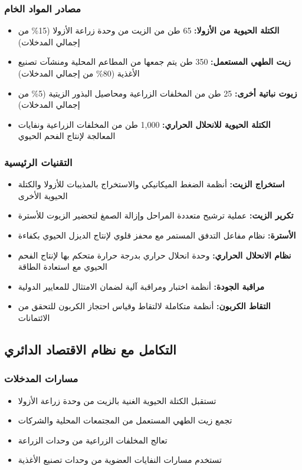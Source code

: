\subsubsection{مصادر المواد الخام}
\begin{itemize}
    \item \textbf{الكتلة الحيوية من الأزولا:} 65 طن من الزيت من وحدة زراعة الأزولا (15\% من إجمالي المدخلات)
    \item \textbf{زيت الطهي المستعمل:} 350 طن يتم جمعها من المطاعم المحلية ومنشآت تصنيع الأغذية (80\% من إجمالي المدخلات)
    \item \textbf{زيوت نباتية أخرى:} 25 طن من المخلفات الزراعية ومحاصيل البذور الزيتية (5\% من إجمالي المدخلات)
    \item \textbf{الكتلة الحيوية للانحلال الحراري:} 1,000 طن من المخلفات الزراعية ونفايات المعالجة لإنتاج الفحم الحيوي
\end{itemize}

\subsubsection{التقنيات الرئيسية}
\begin{itemize}
    \item \textbf{استخراج الزيت:} أنظمة الضغط الميكانيكي والاستخراج بالمذيبات للأزولا والكتلة الحيوية الأخرى
    \item \textbf{تكرير الزيت:} عملية ترشيح متعددة المراحل وإزالة الصمغ لتحضير الزيوت للأسترة
    \item \textbf{الأسترة:} نظام مفاعل التدفق المستمر مع محفز قلوي لإنتاج الديزل الحيوي بكفاءة
    \item \textbf{نظام الانحلال الحراري:} وحدة انحلال حراري بدرجة حرارة متحكم بها لإنتاج الفحم الحيوي مع استعادة الطاقة
    \item \textbf{مراقبة الجودة:} أنظمة اختبار ومراقبة آلية لضمان الامتثال للمعايير الدولية
    \item \textbf{التقاط الكربون:} أنظمة متكاملة لالتقاط وقياس احتجاز الكربون للتحقق من الائتمانات
\end{itemize}

\subsection{التكامل مع نظام الاقتصاد الدائري}

\subsubsection{مسارات المدخلات}
\begin{itemize}
    \item تستقبل الكتلة الحيوية الغنية بالزيت من وحدة زراعة الأزولا
    \item تجمع زيت الطهي المستعمل من المجتمعات المحلية والشركات
    \item تعالج المخلفات الزراعية من وحدات الزراعة
    \item تستخدم مسارات النفايات العضوية من وحدات تصنيع الأغذية
\end{itemize}


